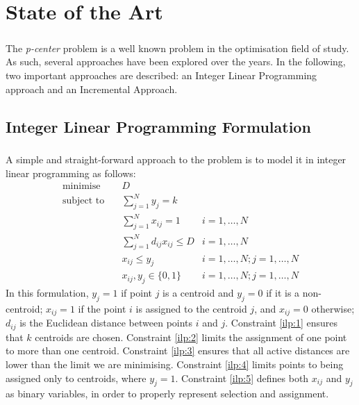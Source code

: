 \chapter{State of the Art}
\label{chap:sota}
\paragraph{}
The \emph{p-center} problem is a well known problem in the optimisation field of study. As such, several approaches have been explored over the years. In the following, two important approaches are described: an Integer Linear Programming approach and an Incremental Approach.

\section{Integer Linear Programming Formulation}
\label{alg:ilp}
\paragraph{}
A simple and straight-forward approach to the problem is to model it in  integer linear programming as follows:
\begin{align}
\text{minimise}   \quad& D							   &\\
\text{subject to} \quad
& \sum\limits_{j=1}^{N}{y_j} = k 
& 							\label{ilp:1}\\
& \sum\limits_{j=1}^{N}{x_{ij}}	= 1   
& i=1,\ldots,N 				\label{ilp:2}\\
& \sum\limits_{j=1}^{N}{d_{ij} x_{ij}} \leq D
& i=1,\ldots,N				\label{ilp:3}\\
& x_{ij} \leq y_{j}				   
& i=1,\ldots,N;j=1,\ldots,N	\label{ilp:4}\\
& x_{ij},y_{j} \in \{0,1\}
& i=1,\ldots,N;j=1,\ldots,N \label{ilp:5}
\end{align}
In this formulation, $y_j = 1$ if point $j$ is a centroid and $y_j = 0$ if it is a non-centroid;
$x_{ij} = 1$ if the point $i$ is assigned to the centroid $j$, and $x_{ij}=0$ otherwise;
$d_{ij}$ is the Euclidean distance between points $i$ and $j$.
Constraint \ref{ilp:1} ensures that $k$ centroids are chosen.
Constraint \ref{ilp:2} limits the assignment of one point to more than one centroid.
Constraint \ref{ilp:3} ensures that all active distances are lower than the limit we are minimising.
Constraint \ref{ilp:4} limits points to being assigned only to centroids, where $y_j=1$.
Constraint \ref{ilp:5} defines both $x_{ij}$ and $y_j$ as binary variables, in order to properly represent selection and assignment.
